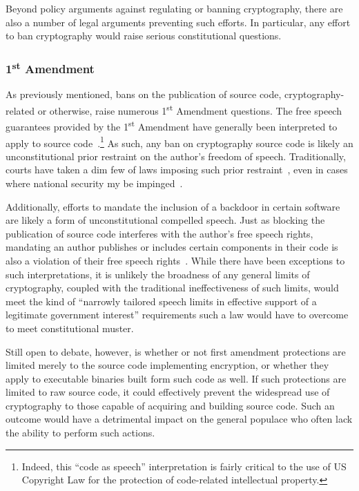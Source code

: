 Beyond policy arguments against regulating or banning cryptography,
there are also a number of legal arguments preventing such efforts. In
particular, any effort to ban cryptography would raise serious
constitutional questions.

\subsubsection{1\textsuperscript{st} Amendment}

As previously mentioned, bans on the publication of source code,
cryptography-related or otherwise, raise numerous
1\textsuperscript{st} Amendment questions. The free speech guarantees
provided by the 1\textsuperscript{st} Amendment have generally been
interpreted to apply to source code~\cite{ninthcir-bernstein,
  sixthcir-junger}.\footnote{Indeed, this ``code as speech''
  interpretation is fairly critical to the use of US Copyright Law for
  the protection of code-related intellectual property.} As such, any
ban on cryptography source code is likely an unconstitutional prior
restraint on the author's freedom of speech. Traditionally, courts
have taken a dim few of laws imposing such prior
restraint~\cite{scotus-nearvminnesota}, even in cases where national
security my be impinged~\cite{scotus-nytvus}.

Additionally, efforts to mandate the inclusion of a backdoor in
certain software are likely a form of unconstitutional compelled
speech. Just as blocking the publication of source code interferes
with the author's free speech rights, mandating an author publishes or
includes certain components in their code is also a violation of their
free speech rights~\cite{scotus-wooleyvmaynard}. While there have been
exceptions to such interpretations, it is unlikely the broadness of
any general limits of cryptography, coupled with the traditional
ineffectiveness of such limits, would meet the kind of ``narrowly
tailored speech limits in effective support of a legitimate government
interest'' requirements such a law would have to overcome to meet
constitutional muster.

Still open to debate, however, is whether or not first amendment
protections are limited merely to the source code implementing
encryption, or whether they apply to executable binaries built form
such code as well. If such protections are limited to raw source code,
it could effectively prevent the widespread use of cryptography to
those capable of acquiring and building source code. Such an outcome
would have a detrimental impact on the general populace who often lack
the ability to perform such actions.

